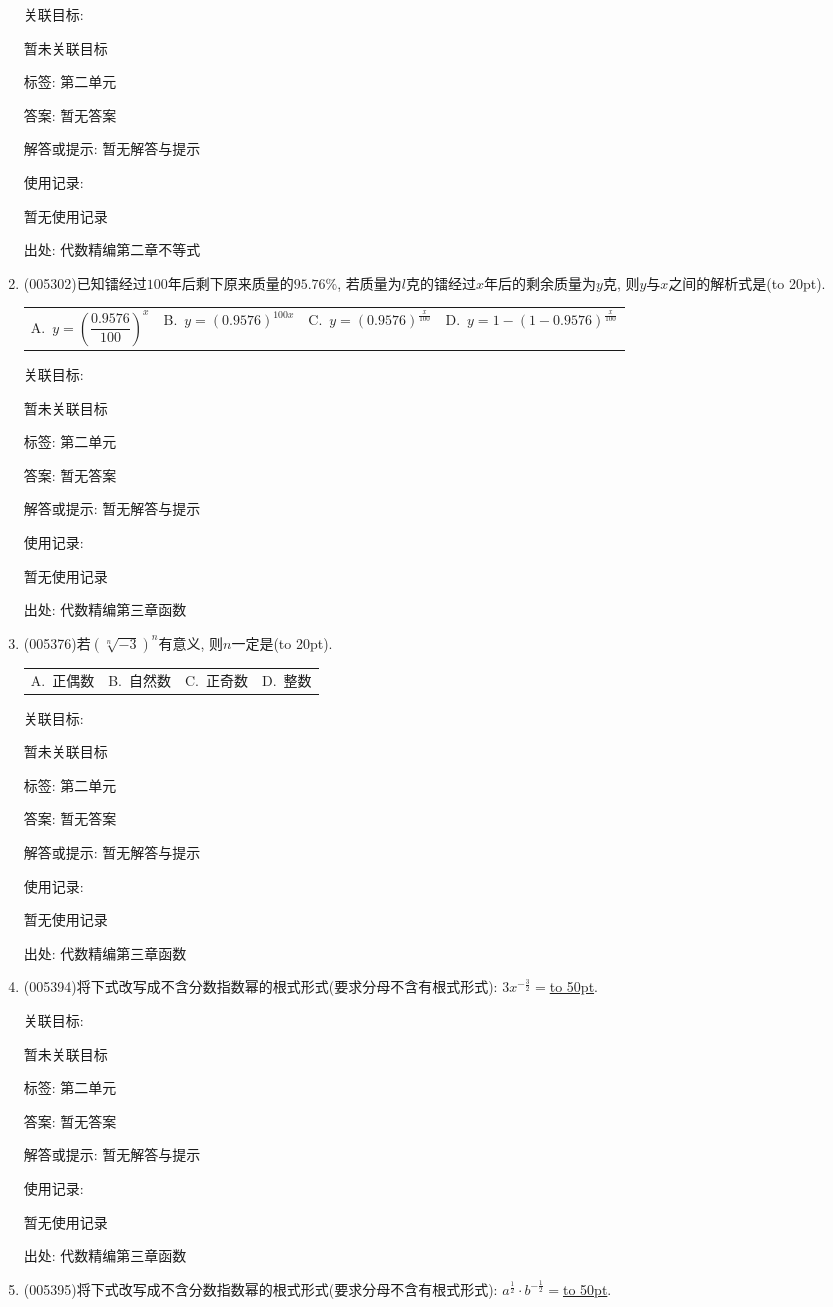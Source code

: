 \documentclass[10pt,a4paper]{article}
\newcommand{\blank}[1]{\underline{\hbox to #1pt{}}}
\newcommand{\bracket}[1]{(\hbox to #1pt{})}
\newcommand{\fourch}[4]{\par\begin{tabular}{p{.23\textwidth}p{.23\textwidth}p{.23\textwidth}p{.23\textwidth}}
A.~#1 &B.~#2& C.~#3& D.~#4
\end{tabular}}
\begin{document}
\begin{enumerate}[1.]
关联目标:

暂未关联目标



标签: 第二单元

答案: 暂无答案

解答或提示: 暂无解答与提示

使用记录:

暂无使用记录


出处: 代数精编第二章不等式
\item { (005302)}已知镭经过$100$年后剩下原来质量的$95.76\%$, 若质量为$l$克的镭经过$x$年后的剩余质量为$y$克, 则$y$与$x$之间的解析式是\bracket{20}.
\fourch{$y=(\dfrac{0.9576}{100})^x$}{$y=(0.9576)^{100x}$}{$y=(0.9576)^{\frac x{100}}$}{$y=1-(1-0.9576)^{\frac x{100}}$}


关联目标:

暂未关联目标



标签: 第二单元

答案: 暂无答案

解答或提示: 暂无解答与提示

使用记录:

暂无使用记录


出处: 代数精编第三章函数
\item { (005376)}若$(\sqrt [n]{-3})^n$有意义, 则$n$一定是\bracket{20}.
\fourch{正偶数}{自然数}{正奇数}{整数}


关联目标:

暂未关联目标



标签: 第二单元

答案: 暂无答案

解答或提示: 暂无解答与提示

使用记录:

暂无使用记录


出处: 代数精编第三章函数
\item { (005394)}将下式改写成不含分数指数幂的根式形式(要求分母不含有根式形式): $3x^{-\frac 32}=$\blank{50}.


关联目标:

暂未关联目标



标签: 第二单元

答案: 暂无答案

解答或提示: 暂无解答与提示

使用记录:

暂无使用记录


出处: 代数精编第三章函数
\item { (005395)}将下式改写成不含分数指数幂的根式形式(要求分母不含有根式形式): $a^{\frac 12}\cdot b^{-\frac 12}=$\blank{50}.



\end{enumerate}
\end{document}
